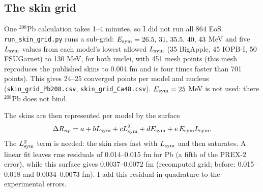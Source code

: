 \documentclass[11pt,a4paper]{article}
\newcommand{\Esym}{E_{\rm sym}}
\newcommand{\Lsym}{L_{\rm sym}}
\newcommand{\DRnp}{\Delta R_{np}}
\begin{document}
\subsection{The skin grid}
One $^{208}$Pb calculation takes 1--4 minutes, so I did not run all 864 EoS. \texttt{run\_skin\_grid.py} runs a sub-grid: $\Esym=26.5,\,31,\,35.5,\,40,\,43$ MeV and five $\Lsym$ values from each model's lowest allowed $\Lsym$ (35 BigApple, 45 IOPB-I, 50 FSUGarnet) to 130 MeV, for both nuclei, with 451 mesh points (this mesh reproduces the published skins to 0.004 fm and is four times faster than 701 points). This gives 24--25 converged points per model and nucleus (\texttt{skin\_grid\_Pb208.csv}, \texttt{skin\_grid\_Ca48.csv}). $\Esym=25$ MeV is not used: there $^{208}$Pb does not bind.

The skins are then represented per model by the surface
\begin{equation}
\DRnp = a + b\Lsym + c\Lsym^2 + d\Esym + e\,\Esym\Lsym .
\end{equation}
The $\Lsym^2$ term is needed: the skin rises fast with $\Lsym$ and then saturates. A linear fit leaves rms residuals of 0.014--0.015 fm for Pb (a fifth of the PREX-2 error), while this surface gives 0.0037--0.0072 fm (recomputed grid; before: 0.015--0.018 and 0.0034--0.0073 fm). I add this residual in quadrature to the experimental errors.

\end{document}
